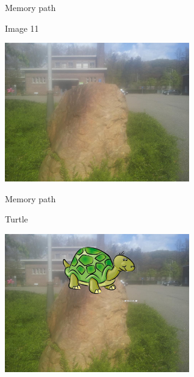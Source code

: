\begin{frame}{Memory path}
  \begin{block}{Image 11}
    \begin{center}
      \includegraphics[height=6cm]{img/loci/11.jpg}
    \end{center}
  \end{block}
\end{frame}
\begin{frame}{Memory path}
  \begin{block}{Turtle}
    \begin{center}
      \includegraphics[height=6cm]{img/loci/11-turtle.jpg}
    \end{center}
  \end{block}
\end{frame}


